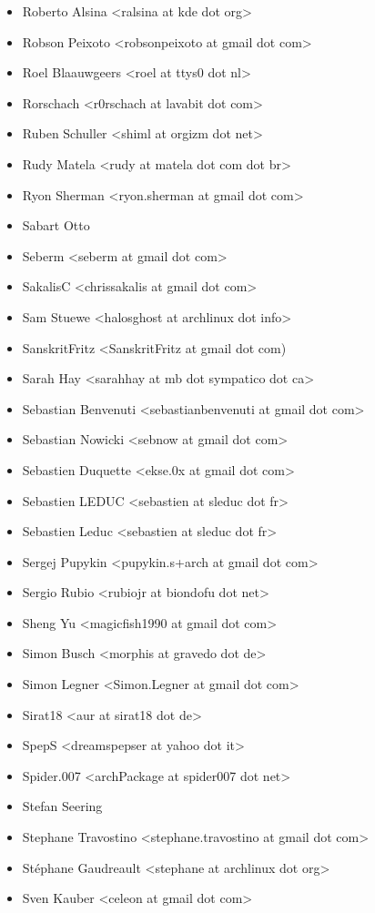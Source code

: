 \begin{itemize}
\item  Roberto Alsina <ralsina at kde dot org>
\item  Robson Peixoto <robsonpeixoto at gmail dot com>
\item  Roel Blaauwgeers <roel at ttys0 dot nl>
\item  Rorschach <r0rschach at lavabit dot com>
\item  Ruben Schuller <shiml at orgizm dot net>
\item  Rudy Matela <rudy at matela dot com dot br>
\item  Ryon Sherman <ryon.sherman at gmail dot com>
\item  Sabart Otto \item  Seberm <seberm at gmail dot com>
\item  SakalisC <chrissakalis at gmail dot com>
\item  Sam Stuewe <halosghost at archlinux dot info>
\item  SanskritFritz <SanskritFritz at gmail dot com)
\item  Sarah Hay <sarahhay at mb dot sympatico dot ca>
\item  Sebastian Benvenuti <sebastianbenvenuti at gmail dot com>
\item  Sebastian Nowicki <sebnow at gmail dot com>
\item  Sebastien Duquette <ekse.0x at gmail dot com>
\item  Sebastien LEDUC <sebastien at sleduc dot fr>
\item  Sebastien Leduc <sebastien at sleduc dot fr>
\item  Sergej Pupykin <pupykin.s+arch at gmail dot com>
\item  Sergio Rubio <rubiojr at biondofu dot net>
\item  Sheng Yu <magicfish1990 at gmail dot com>
\item  Simon Busch <morphis at gravedo dot de>
\item  Simon Legner <Simon.Legner at gmail dot com>
\item  Sirat18 <aur at sirat18 dot de>
\item  SpepS <dreamspepser at yahoo dot it>
\item  Spider.007 <archPackage at spider007 dot net>
\item  Stefan Seering
\item  Stephane Travostino <stephane.travostino at gmail dot com>
\item  Stéphane Gaudreault <stephane at archlinux dot org>
\item  Sven Kauber <celeon at gmail dot com>

\end{itemize}
